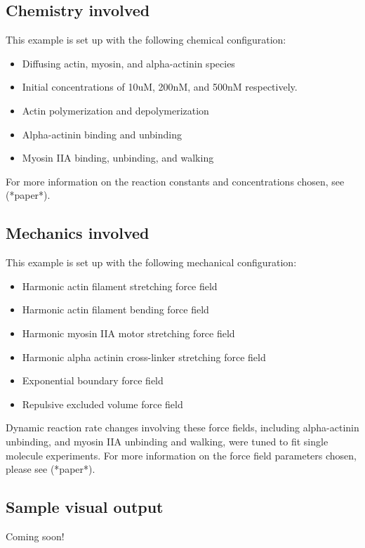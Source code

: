 \documentclass[11pt, oneside]{article}   	%
\begin{document}
\subsection{Chemistry involved}

This example is set up with the following chemical configuration:

\begin{itemize}
\item Diffusing actin, myosin, and alpha-actinin species
\item Initial concentrations of 10uM, 200nM, and 500nM respectively.
\item Actin polymerization and depolymerization
\item Alpha-actinin binding and unbinding
\item Myosin IIA binding, unbinding, and walking

\end{itemize}

\noindent For more information on the reaction constants and concentrations chosen, see (*paper*).

\subsection{Mechanics involved}

This example is set up with the following mechanical configuration:

\begin{itemize}
\item Harmonic actin filament stretching force field
\item Harmonic actin filament bending force field
\item Harmonic myosin IIA motor stretching force field
\item Harmonic alpha actinin cross-linker stretching force field
\item Exponential boundary force field
\item Repulsive excluded volume force field
\end{itemize}

\noindent Dynamic reaction rate changes involving these force fields, including alpha-actinin unbinding, and myosin IIA unbinding and walking, were tuned to fit single molecule experiments.\newline\newline
\noindent For more information on the force field parameters chosen, please see (*paper*). 


\subsection{Sample visual output}

Coming soon!
\end{document}
